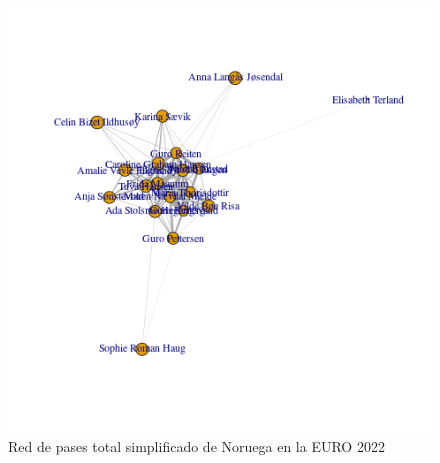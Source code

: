 \begin{figure}[ht!]
  \centering
   \includegraphics[width=\textwidth]{./img/plot_norw_simpl.png}
   \caption{Red de pases total simplificado de Noruega en la EURO 2022}
   \label{img:red:simpl:nor}
\end{figure}

